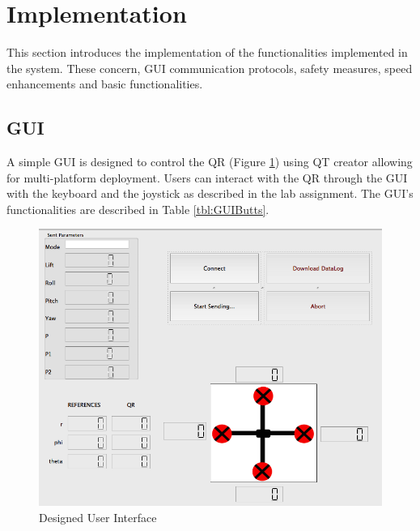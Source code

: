 \documentclass{article}
\begin{document}

\section{Implementation}
\label{sec:implementation}

This section introduces the implementation of the functionalities implemented in the system. These concern, GUI communication protocols, safety measures, speed enhancements and basic functionalities.


\subsection{GUI}
A simple GUI is designed to control the QR (Figure \ref{fig.GUI}) using QT creator allowing for multi-platform deployment. Users can interact with the QR through the GUI with the keyboard and the joystick as described in the lab assignment. The GUI's functionalities are described in Table \ref{tbl:GUIButts}. 

\begin{figure}[ht]
\centering
	\includegraphics[scale=0.35]{Figures/GUI.png}
	\caption{Designed User Interface}
	\label{fig.GUI}
\end{figure}
\end{document}
